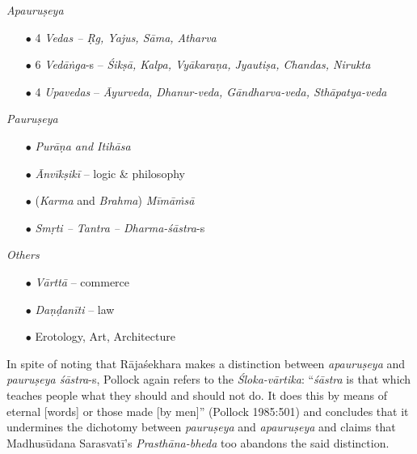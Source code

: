 {\sl Apauruṣeya}\\[-20pt]
\begin{itemize}
\topsep=0pt
\itemsep=0pt
\item[$\bullet$] 4 {\sl Vedas -- Ṛg, Yajus, Sāma, Atharva}

\item[$\bullet$] 6 {\sl Vedāṅga}-s -- {\sl Śikṣā, Kalpa, Vyākaraṇa, Jyautiṣa, Chandas, Nirukta}

\item[$\bullet$] 4 {\sl Upavedas} -- {\sl Āyurveda, Dhanur-veda, Gāndharva-veda, Sthāpatya-veda}\\[-17pt]
\end{itemize}
{\sl Pauruṣeya}\\[-20pt]
\begin{itemize}
\topsep=0pt
\itemsep=0pt
\item[$\bullet$] {\sl Purāṇa and Itihāsa}

\item[$\bullet$] {\sl Ānvīkṣikī} -- logic \& philosophy

\item[$\bullet$] ({\sl Karma} and {\sl Brahma}) {\sl Mīmāṁsā}

\item[$\bullet$] {\sl Smṛti -- Tantra -- Dharma-śāstra}-s\\[-17pt]
\end{itemize}
{\sl Others}\\[-20pt]
\begin{itemize}
\topsep=0pt
\itemsep=0pt
\item[$\bullet$] {\sl Vārttā} -- commerce

\item[$\bullet$] {\sl Daṇḍanīti} -- law

\item[$\bullet$] Erotology, Art, Architecture
\end{itemize}

In spite of noting that Rājaśekhara makes a distinction between {\sl apauruṣeya} and {\sl pauruṣeya śāstra}-s, Pollock again refers to the {\sl Śloka-vārtika}: ``{\sl śāstra} is that which teaches people what they should and should not do. It does this by means of eternal [words] or those made [by men]'' (Pollock 1985:501) and concludes that it undermines the dichotomy between {\sl pauruṣeya} and {\sl apauruṣeya} and claims that Madhusūdana Sarasvatī's  {\sl Prasthāna-bheda} too abandons the said distinction. 

